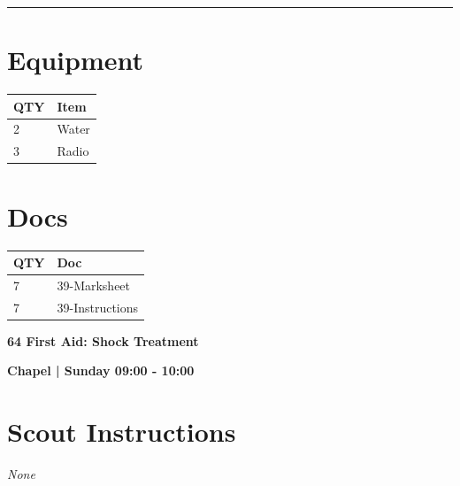 \documentclass[10pt]{article}
\newcommand{\newtitle}[1]{\begin{center}{\Huge\bfseries #1 }\\ \vspace{5mm}\end{center}}
\newcommand{\newsubtitle}[1]{\begin{center}{\color{grey}\Large\bfseries #1 }\\ \vspace{5mm}\end{center}}
\begin{document}
			\vspace{0.5cm}
	\hrule
	\vspace{0.5cm}

	\begin{multicols}{2}

		\section*{\faWrench \: Equipment}

		
	\begin{center}
			\begin{tabular}{p{2cm}p{4cm}}


				\textbf{QTY} & \textbf{Item} \\\toprule
												2&Water\\\midrule
												3&Radio\\\midrule
								\end{tabular}

			\end{center}

		
		\vfill\null
		\columnbreak

			\section*{\faFile \: Docs}
		 	\begin{center}
			\begin{tabular}{p{2cm}p{4cm}}

			\textbf{QTY} & \textbf{Doc} \\\toprule
										7&39-Marksheet\\\midrule
										7&39-Instructions\\\midrule
							\end{tabular}
			\end{center}
	

		\vfill\null

		\end{multicols}



	\vspace{1cm}


	\clearpage
		\newtitle{64 First Aid: Shock Treatment }
	\newsubtitle{Chapel | Sunday 09:00 - 10:00}
		\setcounter{section}{63}
	\section*{Scout Instructions}
		\textit{None}
	
\end{document}
